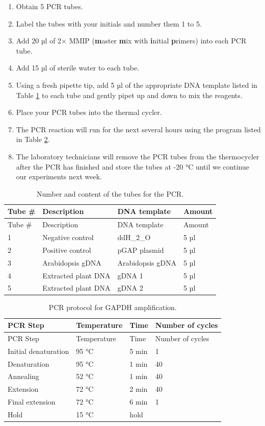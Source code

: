 \documentclass[]{book}
\providecommand{\tightlist}{%
  \setlength{\itemsep}{0pt}\setlength{\parskip}{0pt}}
\begin{document}
\begin{enumerate}
\def\labelenumi{\arabic{enumi}.}
\tightlist
\item
  Obtain 5 PCR tubes.
\item
  Label the tubes with your initials and number them 1 to 5.
\item
  Add 20 µl of 2× MMIP (\textbf{m}aster \textbf{m}ix with
  \textbf{i}nitial \textbf{p}rimers) into each PCR tube.
\item
  Add 15 µl of sterile water to each tube.
\item
  Using a fresh pipette tip, add 5 µl of the appropriate DNA template
  listed in Table \ref{tab:tubes} to each tube and gently pipet up and
  down to mix the reagents.
\item
  Place your PCR tubes into the thermal cycler.
\item
  The PCR reaction will run for the next several hours using the program
  listed in Table \ref{tab:pcr}.
\item
  The laboratory technicians will remove the PCR tubes from the
  thermocycler after the PCR has finished and store the tubes at -20 °C
  until we continue our experiments next week.
\end{enumerate}

\begin{longtable}[]{@{}llll@{}}
\caption{\label{tab:tubes} Number and content of the tubes for the
PCR.}\tabularnewline
\toprule
Tube \# & Description & DNA template & Amount\tabularnewline
\midrule
\endfirsthead
\toprule
Tube \# & Description & DNA template & Amount\tabularnewline
\midrule
\endhead
1 & Negative control & ddH\_2\_O & 5 µl\tabularnewline
2 & Positive control & pGAP plasmid & 5 µl\tabularnewline
3 & Arabidopsis gDNA & Arabidopsis gDNA & 5 µl\tabularnewline
4 & Extracted plant DNA & gDNA 1 & 5 µl\tabularnewline
5 & Extracted plant DNA & gDNA 2 & 5 µl\tabularnewline
\bottomrule
\end{longtable}

\begin{longtable}[]{@{}llll@{}}
\caption{\label{tab:pcr} PCR protocol for GAPDH
amplification.}\tabularnewline
\toprule
PCR Step & Temperature & Time & Number of cycles\tabularnewline
\midrule
\endfirsthead
\toprule
PCR Step & Temperature & Time & Number of cycles\tabularnewline
\midrule
\endhead
Initial denaturation & 95 °C & 5 min & 1\tabularnewline
Denaturation & 95 °C & 1 min & 40\tabularnewline
Annealing & 52 °C & 1 min & 40\tabularnewline
Extension & 72 °C & 2 min & 40\tabularnewline
Final extension & 72 °C & 6 min & 1\tabularnewline
Hold & 15 °C & hold &\tabularnewline
\bottomrule
\end{longtable}
\end{document}
